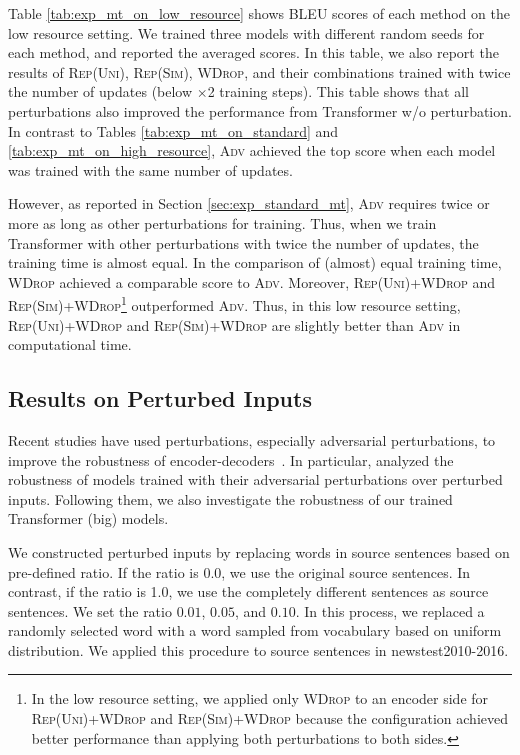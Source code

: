 \documentclass[11pt]{article}
\newcommand{\uniform}{\textsc{Rep(Uni)}}
\newcommand{\similarity}{\textsc{Rep(Sim)}}
\newcommand{\worddrop}{\textsc{WDrop}}
\newcommand{\adv}{\textsc{Adv}}
\begin{document}
Table \ref{tab:exp_mt_on_low_resource} shows BLEU scores of each method on the low resource setting.
We trained three models with different random seeds for each method, and reported the averaged scores.
In this table, we also report the results of \uniform{}, \similarity{}, \worddrop{}, and their combinations trained with twice the number of updates (below $\times$2 training steps).
This table shows that all perturbations also improved the performance from Transformer w/o perturbation.
In contrast to Tables \ref{tab:exp_mt_on_standard} and \ref{tab:exp_mt_on_high_resource}, \adv{} achieved the top score when each model was trained with the same number of updates.


However, as reported in Section \ref{sec:exp_standard_mt}, \adv{} requires twice or more as long as other perturbations for training.
Thus, when we train Transformer with other perturbations with twice the number of updates, the training time is almost equal.
In the comparison of (almost) equal training time, \worddrop{} achieved a comparable score to \adv{}.
Moreover, \uniform{}+\worddrop{} and \similarity{}+\worddrop{}\footnote{In the low resource setting, we applied only \worddrop{} to an encoder side for \uniform{}+\worddrop{} and \similarity{}+\worddrop{} because the configuration achieved better performance than applying both perturbations to both sides.} outperformed \adv{}.
Thus, in this low resource setting, \uniform{}+\worddrop{} and \similarity{}+\worddrop{} are slightly better than \adv{} in computational time.


\subsection{Results on Perturbed Inputs}
\label{sec:exp_on_perturbed_input}

Recent studies have used perturbations, especially adversarial perturbations, to improve the robustness of encoder-decoders~\cite{sato-etal-2019-effective,cheng-etal-2019-robust,pmlr-v97-wang19f}.
In particular,  analyzed the robustness of models trained with their adversarial perturbations over perturbed inputs.
Following them, we also investigate the robustness of our trained Transformer (big) models.


We constructed perturbed inputs by replacing words in source sentences based on pre-defined ratio.
If the ratio is 0.0, we use the original source sentences.
In contrast, if the ratio is 1.0, we use the completely different sentences as source sentences.
We set the ratio $0.01$, $0.05$, and $0.10$.
In this process, we replaced a randomly selected word with a word sampled from vocabulary based on uniform distribution.
We applied this procedure to source sentences in newstest2010-2016.
\end{document}
